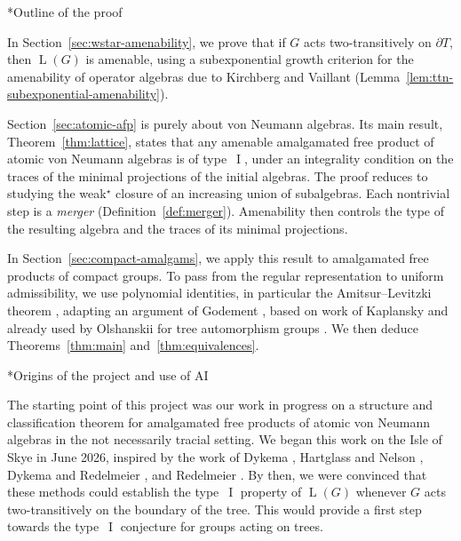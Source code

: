 \documentclass[11pt]{amsart}
\makeatletter
\numberwithin{equation}{section}
\def\subsection{\@startsection{subsection}{2}%
  \z@{.7\linespacing\@plus.7\linespacing}{.3\linespacing}%
  {\normalfont\bfseries}}
\DeclareMathOperator{\LL}{L}
\DeclareMathOperator{\I}{I}
\theoremstyle{definition}
\makeatother
\begin{document}
\subsection*{Outline of the proof}

In Section~\ref{sec:wstar-amenability}, we prove that if $G$ acts two-transitively on $\partial T$, then $\LL(G)$ is amenable, using a subexponential growth criterion for the amenability of operator algebras due to Kirchberg and Vaillant (Lemma~\ref{lem:ttn-subexponential-amenability}).

Section~\ref{sec:atomic-afp} is purely about von Neumann algebras. Its main result, Theorem~\ref{thm:lattice}, states that any amenable amalgamated free product of atomic von Neumann algebras is of type~$\I$, under an integrality condition on the traces of the minimal projections of the initial algebras. The proof reduces to studying the weak$^\star$ closure of an increasing union of subalgebras. Each nontrivial step is a \emph{merger} (Definition~\ref{def:merger}). Amenability then controls the type of the resulting algebra and the traces of its minimal projections.

In Section~\ref{sec:compact-amalgams}, we apply this result to amalgamated free products of compact groups. To pass from the regular representation to uniform admissibility, we use polynomial identities, in particular the Amitsur--Levitzki theorem \cite{AL50}, adapting an argument of Godement \cite[Lemma~4]{Go52}, based on work of Kaplansky \cite{Ka49} and already used by Olshanskii for tree automorphism groups \cite[Lemma~3]{Ol75}. We then deduce Theorems~\ref{thm:main} and~\ref{thm:equivalences}.

\subsection*{Origins of the project and use of AI}

The starting point of this project was our work in progress on a structure and classification theorem for amalgamated free products of atomic von Neumann algebras in the not necessarily tracial setting. We began this work on the Isle of Skye in June 2026, inspired by the work of Dykema \cite{Dy93,Dy95}, Hartglass and Nelson \cite{HN21}, Dykema and Redelmeier \cite{DR13}, and Redelmeier \cite{Re13}. By then, we were convinced that these methods could establish the type~$\I$ property of $\LL(G)$ whenever $G$ acts two-transitively on the boundary of the tree. This would provide a first step towards the type~$\I$ conjecture for groups acting on trees.
\end{document}
